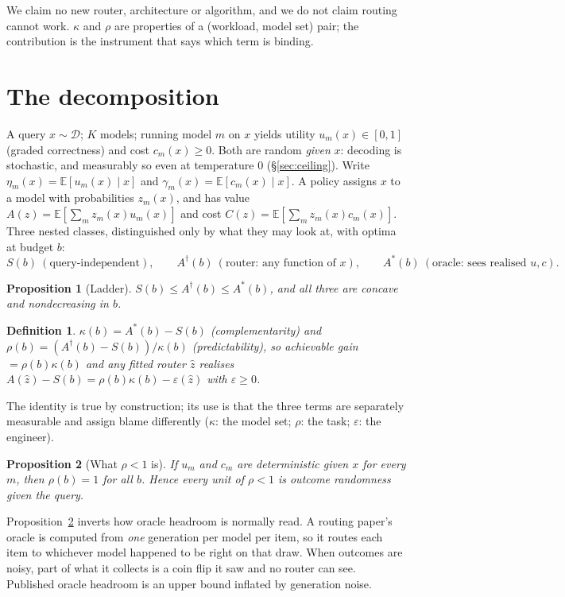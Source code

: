 \documentclass[10pt]{article}
\newtheorem{proposition}{Proposition}
\newtheorem{definition}{Definition}
\newcommand{\Sb}{S(b)}
\newcommand{\Adag}{A^{\dagger}(b)}
\newcommand{\Astar}{A^{*}(b)}
\newcommand{\kap}{\kappa(b)}
\newcommand{\E}{\mathbb{E}}
\begin{document}
We claim no new router, architecture or algorithm, and we do not claim routing
cannot work. $\kappa$ and $\rho$ are properties of a (workload, model set) pair;
the contribution is the instrument that says which term is binding.

\section{The decomposition}\label{sec:theory}

A query $x\sim\mathcal D$; $K$ models; running model $m$ on $x$ yields utility
$u_m(x)\in[0,1]$ (graded correctness) and cost $c_m(x)\ge 0$. Both are random
\emph{given} $x$: decoding is stochastic, and measurably so even at temperature
$0$ (\S\ref{sec:ceiling}). Write $\eta_m(x)=\E[u_m(x)\mid x]$ and
$\gamma_m(x)=\E[c_m(x)\mid x]$. A policy assigns $x$ to a model with
probabilities $z_m(x)$, and has value $A(z)=\E[\sum_m z_m(x)u_m(x)]$ and cost
$C(z)=\E[\sum_m z_m(x)c_m(x)]$. Three nested classes, distinguished only by
what they may look at, with optima at budget $b$:
\[
\Sb\ (\text{query-independent}),\qquad
\Adag\ (\text{router: any function of }x),\qquad
\Astar\ (\text{oracle: sees realised }u,c).
\]

\begin{proposition}[Ladder]\label{prop:ladder}
$\Sb\le\Adag\le\Astar$, and all three are concave and nondecreasing in $b$.
\end{proposition}

\begin{definition}
$\kap=\Astar-\Sb$ \emph{(complementarity)} and
$\rho(b)=(\Adag-\Sb)/\kap$ \emph{(predictability)}, so achievable gain
$=\rho(b)\kap$ and any fitted router $\hat z$ realises
$A(\hat z)-\Sb=\rho(b)\kap-\varepsilon(\hat z)$ with $\varepsilon\ge0$.
\end{definition}

The identity is true by construction; its use is that the three terms are
separately measurable and assign blame differently ($\kappa$: the model set;
$\rho$: the task; $\varepsilon$: the engineer).

\begin{proposition}[What $\rho<1$ is]\label{prop:rho}
If $u_m$ and $c_m$ are deterministic given $x$ for every $m$, then $\rho(b)=1$
for all $b$. Hence every unit of $\rho<1$ is outcome randomness given the query.
\end{proposition}

Proposition~\ref{prop:rho} inverts how oracle headroom is normally read. A
routing paper's oracle is computed from \emph{one} generation per model per
item, so it routes each item to whichever model happened to be right on that
draw. When outcomes are noisy, part of what it collects is a coin flip it saw
and no router can see. Published oracle headroom is an upper bound inflated by
generation noise.
\end{document}
